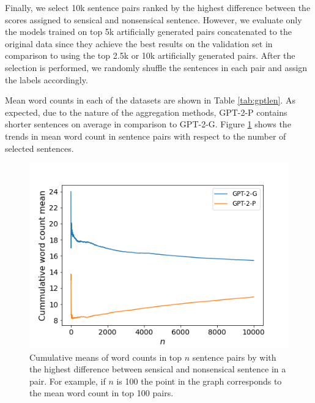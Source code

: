 \documentclass[10pt, a4paper]{article}
\begin{document}
Finally, we select 10k sentence pairs ranked by the highest difference between the scores assigned to sensical and nonsensical sentence. However, we evaluate only the models trained on top 5k artificially generated pairs concatenated to the original data since they achieve the best results on the validation set in comparison to using the top 2.5k or 10k artificially generated pairs. After the selection is performed, we randomly shuffle the sentences in each pair and assign the labels accordingly. 

Mean word counts in each of the datasets are shown in Table \ref{tab:gptlen}. As expected, due to the nature of the aggregation methods, GPT-2-P contains shorter sentences on average in comparison to GPT-2-G. Figure \ref{fig:cum} shows the trends in mean word count in sentence pairs with respect to the number of selected sentences.
\begin{figure}
    \centering
    \includegraphics[width=\columnwidth]{images/cummean (2).png}
    \caption{Cumulative means of word counts in top $n$ sentence pairs by with the highest difference between sensical and nonsensical sentence in a pair. For example, if $n$ is 100 the point in the graph corresponds to the mean word count in top 100 pairs.}
    \label{fig:cum}
\end{figure}




\end{document}
